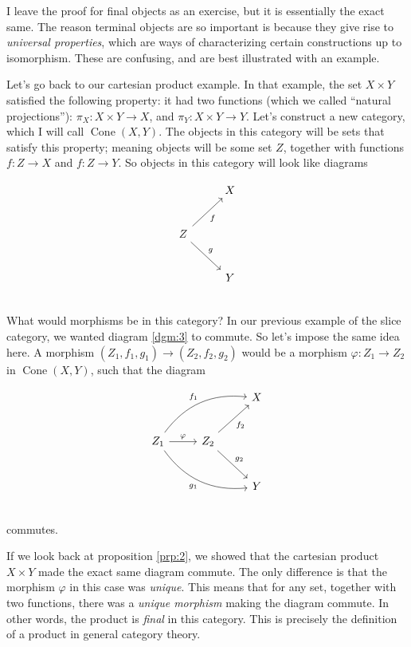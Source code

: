 \documentclass[11pt, letterpaper]{article}
\begin{document}
I leave the proof for final objects as an exercise, but it is essentially the exact same. The reason terminal objects are so important is because they give rise to \emph{universal properties}, which are ways of characterizing certain constructions up to isomorphism. These are confusing, and are best illustrated with an example.

Let's go back to our cartesian product example. In that example, the set $X\times Y$ satisfied the following property: it had two functions (which we called ``natural projections''): $\pi_X : X\times Y \to X$, and $\pi _Y : X\times Y \to Y$. Let's construct a new category, which I will call $\operatorname{Cone} (X,Y)$. The objects in this category will be sets that satisfy this property; meaning objects will be some set $Z$, together with functions $f : Z \to X$ and $f : Z \to Y$. So objects in this category will look like diagrams
\begin{diagram}[ht]
	\[\begin{tikzcd}[row sep = 2.5em, column sep = 2.5em]
		&X\\
		Z\ar[ur, "f"']\ar[dr, "g"]\\
		&Y
	\end{tikzcd}\]
	\caption{Objects in $\operatorname{Cone} (X,Y)$}\label{dgm:4}
\end{diagram}\\
What would morphisms be in this category? In our previous example of the slice category, we wanted diagram \ref{dgm:3} to commute. So let's impose the same idea here. A morphism $(Z_1,f_1,g_1)\to (Z_2,f_2,g_2)$ would be a morphism $\varphi : Z_1 \to Z_2$ in $\operatorname{Cone} (X,Y)$, such that the diagram
\begin{diagram}[ht]
	\[\begin{tikzcd}[row sep = 2.5em, column sep = 2.5em]
		&&X\\
		Z_1\ar[r, "\varphi "]\ar[urr, bend left, "f_1"]\ar[drr, bend right, "g_1"']&Z_2\ar[ur, "f_2"']\ar[dr, "g_2"]\\
												  &&Y
	\end{tikzcd}\]
	\caption{Morphisms in $\operatorname{Cone} (X,Y)$}\label{dgm:5}
\end{diagram}\\
commutes.

If we look back at proposition \ref{prp:2}, we showed that the cartesian product $X\times Y$ made the exact same diagram commute. The only difference is that the morphism $\varphi $ in this case was \emph{unique}. This means that for any set, together with two functions, there was a \emph{unique morphism} making the diagram commute. In other words, the product is \emph{final} in this category. This is precisely the definition of a product in general category theory.
\end{document}
